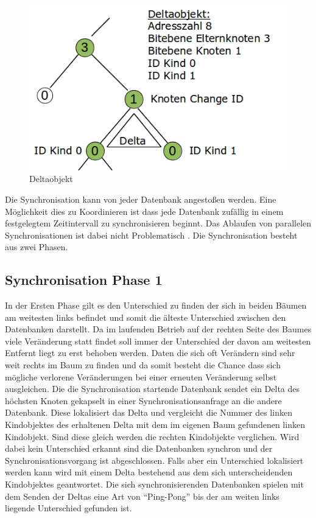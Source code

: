 \documentclass[a4paper,11pt,oneside,%
headsepline,												%
footsepline,												%
bibtotocnumbered									%
]{scrreprt}
\begin{document}
\begin{figure}
  \begin{center}
    \includegraphics[width=.6\linewidth]{bilder/SynchroDelta.png}
  \end{center}
 \caption{Deltaobjekt}
\end{figure}
Die Synchronisation kann von jeder Datenbank angestoßen werden. Eine Möglichkeit dies zu Koordinieren ist dass jede Datenbank zufällig in einem festgelegtem Zeitintervall zu synchronisieren beginnt. Das Ablaufen von parallelen Synchronisationen ist dabei nicht Problematisch . Die Synchronisation besteht aus zwei Phasen. 
\subsection{Synchronisation Phase 1} 
In der Ersten Phase gilt es den Unterschied zu finden der sich in beiden Bäumen am weitesten links befindet und somit die älteste Unterschied zwischen den Datenbanken darstellt. Da im laufenden Betrieb auf der rechten Seite des Baumes viele Veränderung statt findet soll immer der Unterschied der davon am weitesten Entfernt liegt zu erst behoben werden. Daten die sich oft Verändern sind sehr weit rechts im Baum zu finden und da somit besteht die Chance dass sich mögliche verlorene Veränderungen bei einer erneuten Veränderung selbst ausgleichen.
Die die Synchronisation startende Datenbank sendet ein Delta des höchsten Knoten gekapselt in einer Synchronisationsanfrage an die andere Datenbank. Diese lokalisiert das Delta und vergleicht die Nummer des linken Kindobjektes des erhaltenen Delta mit dem  im eigenen Baum gefundenen linken Kindobjekt. Sind diese gleich werden die rechten Kindobjekte verglichen. Wird dabei kein Unterschied erkannt sind die Datenbanken synchron und der Synchronisationsvorgang ist abgeschlossen. Falls aber ein Unterschied lokalisiert werden kann wird mit einem Delta bestehend aus dem sich unterscheidenden Kindobjektes geantwortet. Die sich synchronisierenden Datenbanken spielen mit dem Senden der Deltas eine Art von \enquote{Ping-Pong} bis der am weiten links liegende Unterschied gefunden ist. 
\end{document}
